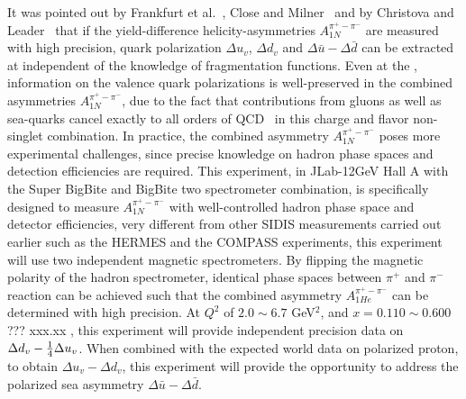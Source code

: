 It was  pointed out by Frankfurt et al.~\cite{LFrankfurt1989141}, Close and Milner~\cite{PhysRevD.44.3691} and by Christova and Leader~\cite{Christova:1999he, Christova:2000nz} that 
if the yield-difference  helicity-asymmetries $A_{1N}^{\pi^+ - \pi^-}$ are measured with  high precision,
quark polarization $\Delta u_v$, $\Delta d_v$ and $\Delta \bar{u} - \Delta \bar{d}$ can be extracted
at \lo independent of the knowledge of fragmentation functions.  Even 
at the \nloo, information on the 
valence quark polarizations is well-preserved in the combined 
asymmetries $A_{1N}^{\pi^+ - \pi^-}$, due to the fact that contributions from 
gluons as well as sea-quarks cancel exactly to all orders of QCD~\cite{Christova:2000nz} in this charge and flavor 
non-singlet combination.
In practice, the combined asymmetry $A_{1N}^{\pi^+ - \pi^-}$ poses more
experimental challenges, since precise knowledge on hadron phase spaces and detection 
efficiencies are required. This experiment,  in JLab-12GeV Hall A with the Super BigBite and BigBite two spectrometer combination,  is specifically designed to measure $A_{1N}^{\pi^+ - \pi^-}$ with well-controlled hadron phase space and detector efficiencies,  
 very different from other SIDIS measurements carried out earlier such as  the HERMES and the  COMPASS experiments,
this experiment will use two independent magnetic spectrometers. By flipping the magnetic 
polarity of the hadron spectrometer, identical phase spaces between $\pi^+$ and $\pi^-$ 
reaction can be achieved such that the combined asymmetry $A_{1He}^{\pi^+ - \pi^-}$ can be 
determined with high precision.
At $Q^2$ of $2.0\sim 6.7$ GeV$^2$, and $x=0.110 \sim 0.600$ ??? xxx.xx , this experiment will 
provide independent precision data on $\Delta d_v -{1 \over 4} \Delta u_v$.
When combined with the expected world data on polarized proton, 
to obtain $\Delta u_v - \Delta d_v$,
this experiment will provide the
opportunity to address the polarized sea asymmetry $\Delta \bar{u}- \Delta \bar{d}$. 

